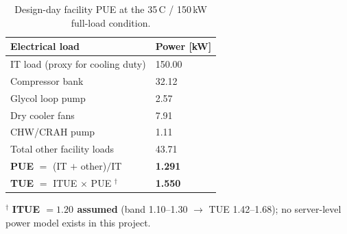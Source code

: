 \begin{table}[h!]
\caption{Design-day facility PUE at the 35\,\textdegree C / 150\,kW full-load condition.}
\label{tab:pue}
\begin{tabularx}{\linewidth}{lL}
\toprule
\textbf{Electrical load} & \textbf{Power [kW]} \\
\midrule
IT load (proxy for cooling duty) & 150.00 \\
\midrule
Compressor bank & 32.12 \\
Glycol loop pump & 2.57 \\
Dry cooler fans & 7.91 \\
CHW/CRAH pump & 1.11 \\
\midrule
Total other facility loads & 43.71 \\
\textbf{PUE} $=$ (IT $+$ other)$/$IT & \textbf{1.291} \\
\textbf{TUE} $=$ ITUE $\times$ PUE $^{\dagger}$ & \textbf{1.550} \\
\bottomrule
\end{tabularx}
{\small $^{\dagger}$ \textbf{ITUE $= 1.20$ assumed} (band 1.10--1.30 $\rightarrow$ TUE 1.42--1.68); no server-level power model exists in this project.}
\end{table}
